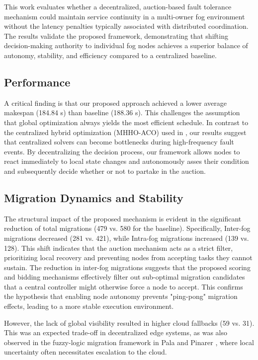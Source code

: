 \documentclass{article}
\begin{document}
This work evaluates whether a decentralized, auction-based fault tolerance mechanism could maintain service continuity in a multi-owner fog environment without the latency penalties typically associated with distributed coordination. The results validate the proposed framework, demonstrating that shifting decision-making authority to individual fog nodes achieves a superior balance of autonomy, stability, and efficiency compared to a centralized baseline.

\subsection{Performance}
A critical finding is that our proposed approach achieved a lower average makespan (184.84 s) than baseline (188.36 s). This challenges the assumption that global optimization always yields the most efficient schedule. In contrast to the centralized hybrid optimization (MHHO-ACO) used in \cite{kashyapHybridApproachFaulttolerance2024b}, our results suggest that centralized solvers can become bottlenecks during high-frequency fault events. By decentralizing the decision process, our framework allows nodes to react immediately to local state changes and autonomously asses their condition and subsequently decide whether or not to partake in the auction. 

\subsection{Migration Dynamics and Stability}
The structural impact of the proposed mechanism is evident in the significant reduction of total migrations (479 vs. 580 for the baseline). Specifically, Inter-fog migrations decreased (281 vs. 421), while Intra-fog migrations increased (139 vs. 128). This shift indicates that the auction mechanism acts as a strict filter, prioritizing local recovery and preventing nodes from accepting tasks they cannot sustain. The reduction in inter-fog migrations suggests that the proposed scoring and bidding mechanisms effectively filter out sub-optimal migration candidates that a central controller might otherwise force a node to accept. This confirms the hypothesis that enabling node autonomy prevents "ping-pong" migration effects, leading to a more stable execution environment.

However, the lack of global visibility resulted in higher cloud fallbacks (59 vs. 31). This was an expected trade-off in decentralized edge systems, as  was also observed in the fuzzy-logic migration framework in Pala and Pinarer \cite{palaContainerMigrationApproach2025}, where local uncertainty often necessitates escalation to the cloud.
\end{document}
